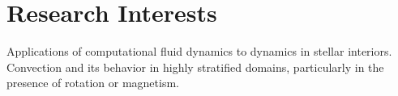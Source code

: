 \section{Research Interests}

Applications of computational fluid dynamics to dynamics in stellar interiors.
Convection and its behavior in highly stratified domains, particularly in the presence of rotation or magnetism.
